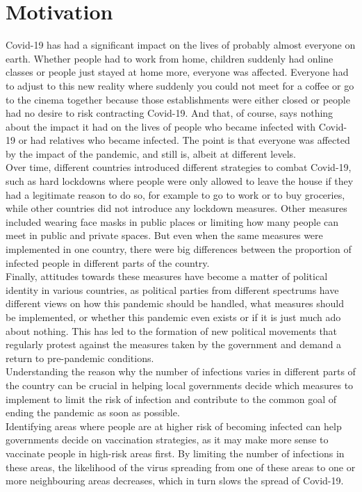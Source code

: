 \section{Motivation}
Covid-19 has had a significant impact on the lives of probably almost everyone on earth. Whether people had to work from home, children suddenly had online classes or people just stayed at home more, everyone was affected. Everyone had to adjust to this new reality where suddenly you could not meet for a coffee or go to the cinema together because those establishments were either closed or people had no desire to risk contracting Covid-19. And that, of course, says nothing about the impact it had on the lives of people who became infected with Covid-19 or had relatives who became infected. The point is that everyone was affected by the impact of the pandemic, and still is, albeit at different levels. \\
Over time, different countries introduced different strategies to combat Covid-19, such as hard lockdowns where people were only allowed to leave the house if they had a legitimate reason to do so, for example to go to work or to buy groceries, while other countries did not introduce any lockdown measures. Other measures included wearing face masks in public places or limiting how many people can meet in public and private spaces. But even when the same measures were implemented in one country, there were big differences between the proportion of infected people in different parts of the country. \\
Finally, attitudes towards these measures have become a matter of political identity in various countries, as political parties from different spectrums have different views on how this pandemic should be handled, what measures should be implemented, or whether this pandemic even exists or if it is just much ado about nothing. This has led to the formation of new political movements that regularly protest against the measures taken by the government and demand a return to pre-pandemic conditions. \\
Understanding the reason why the number of infections varies in different parts of the country can be crucial in helping local governments decide which measures to implement to limit the risk of infection and contribute to the common goal of ending the pandemic as soon as possible. \\
Identifying areas where people are at higher risk of becoming infected can help governments decide on vaccination strategies, as it may make more sense to vaccinate people in high-risk areas first. By limiting the number of infections in these areas, the likelihood of the virus spreading from one of these areas to one or more neighbouring areas decreases, which in turn slows the spread of Covid-19.
\clearpage
